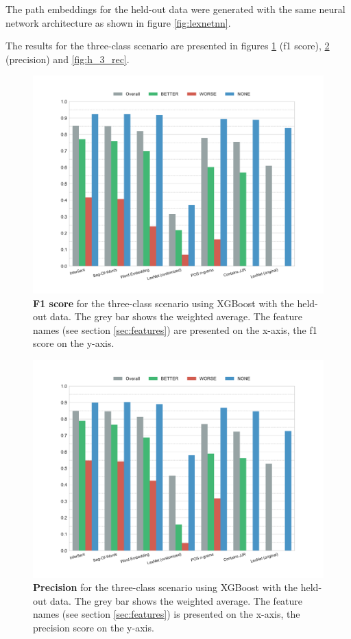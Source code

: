 The path embeddings for the held-out data were generated with the same neural network architecture as shown in figure \ref{fig:lexnetnn}.

The results for the three-class scenario are presented in figures \ref{fig:h_3_f1} (f1 score), \ref{fig:h_3_prec} (precision) and \ref{fig:h_3_rec}.


\begin{figure}[htbp]
         \caption{\textbf{F1 score} for the three-class scenario using XGBoost with the held-out data. The grey bar shows the weighted average. The feature names (see section \ref{sec:features}) are presented on the x-axis, the f1 score on the y-axis.} 
    \label{fig:h_3_f1}
    \centering
	\includegraphics[width=1\linewidth]{images/heldout/h-f1-False}
    \end{figure}
    


\begin{figure}[htbp]
         \caption{\textbf{Precision} for the three-class scenario using XGBoost with the held-out data. The grey bar shows the weighted average. The feature names (see section \ref{sec:features}) is presented on the x-axis, the precision score on the y-axis.} 
    \label{fig:h_3_prec}
    \centering
	\includegraphics[width=0.9\linewidth]{images/heldout/h-precision-False}
    \end{figure}
    
